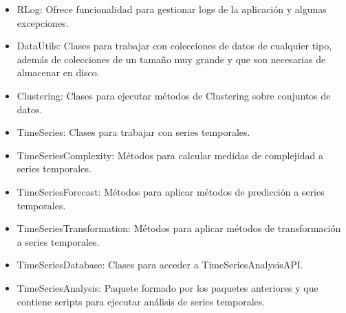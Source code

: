 \documentclass[14pt]{extarticle}
\theoremstyle{definition}
\theoremstyle{remark}
\begin{document}
\begin{itemize}
	\item RLog: Ofrece funcionalidad para gestionar logs de la aplicación y algunas excepciones.
	\item DataUtils: Clases para trabajar con colecciones de datos de cualquier tipo, además de colecciones de un tamaño muy grande y que son necesarias de almacenar en disco.
	\item Clustering: Clases para ejecutar métodos de Clustering sobre conjuntos de datos.
	\item TimeSeries: Clases para trabajar con series temporales.
	\item TimeSeriesComplexity: Métodos para calcular medidas de complejidad a series temporales.
	\item TimeSeriesForecast: Métodos para aplicar métodos de predicción a series temporales.
	\item TimeSeriesTransformation: Métodos para aplicar métodos de transformación a series temporales.
	\item TimeSeriesDatabase: Clases para acceder a TimeSeriesAnalysisAPI.
	\item TimeSeriesAnalysis: Paquete formado por los paquetes anteriores y que contiene scripts para ejecutar análisis de series temporales.
\end{itemize}
\end{document}
